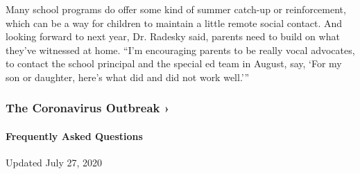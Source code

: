 Many school programs do offer some kind of summer catch-up or
reinforcement, which can be a way for children to maintain a little
remote social contact. And looking forward to next year, Dr. Radesky
said, parents need to build on what they've witnessed at home. ``I'm
encouraging parents to be really vocal advocates, to contact the school
principal and the special ed team in August, say, `For my son or
daughter, here's what did and did not work well.'''

\href{https://www.nytimes.com/news-event/coronavirus?action=click\&pgtype=Article\&state=default\&region=MAIN_CONTENT_3\&context=storylines_faq}{}

\hypertarget{the-coronavirus-outbreak-}{%
\subsubsection{The Coronavirus Outbreak
›}\label{the-coronavirus-outbreak-}}

\hypertarget{frequently-asked-questions}{%
\paragraph{Frequently Asked
Questions}\label{frequently-asked-questions}}

Updated July 27, 2020

